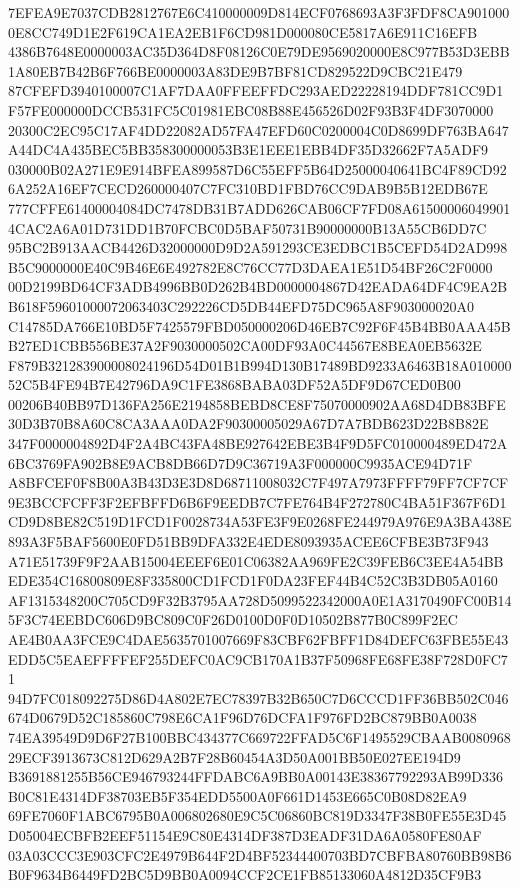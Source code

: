 \documentclass[UTF8,fontset=fandol,zihao=-4,a4paper]{ctexart}
\begin{document}
{{7EFEA9E7037CDB2812767E6C410000009D814ECF0768693A3F3FDF8CA9010000E8CC749D1E2F619CA1EA2EB1F6CD981D000080CE5817A6E911C16EFB
4386B7648E0000003AC35D364D8F08126C0E79DE9569020000E8C977B53D3EBB1A80EB7B42B6F766BE0000003A83DE9B7BF81CD829522D9CBC21E479
87CFEFD3940100007C1AF7DAA0FFEEFFDC293AED22228194DDF781CC9D1F57FE000000DCCB531FC5C01981EBC08B88E456526D02F93B3F4DF3070000
20300C2EC95C17AF4DD22082AD57FA47EFD60C0200004C0D8699DF763BA647A44DC4A435BEC5BB358300000053B3E1EEE1EBB4DF35D32662F7A5ADF9
030000B02A271E9E914BFEA899587D6C55EFF5B64D25000040641BC4F89CD926A252A16EF7CECD260000407C7FC310BD1FBD76CC9DAB9B5B12EDB67E
777CFFE61400004084DC7478DB31B7ADD626CAB06CF7FD08A615000060499014CAC2A6A01D731DD1B70FCBC0D5BAF50731B90000000B13A55CB6DD7C
95BC2B913AACB4426D32000000D9D2A591293CE3EDBC1B5CEFD54D2AD998B5C9000000E40C9B46E6E492782E8C76CC77D3DAEA1E51D54BF26C2F0000
00D2199BD64CF3ADB4996BB0D262B4BD0000004867D42EADA64DF4C9EA2BB618F59601000072063403C292226CD5DB44EFD75DC965A8F903000020A0
C14785DA766E10BD5F7425579FBD050000206D46EB7C92F6F45B4BB0AAA45BB27ED1CBB556BE37A2F9030000502CA00DF93A0C44567E8BEA0EB5632E
F879B321283900008024196D54D01B1B994D130B17489BD9233A6463B18A01000052C5B4FE94B7E42796DA9C1FE3868BABA03DF52A5DF9D67CED0B00
00206B40BB97D136FA256E2194858BEBD8CE8F75070000902AA68D4DB83BFE30D3B70B8A60C8CA3AAA0DA2F90300005029A67D7A7BDB623D22B8B82E
347F0000004892D4F2A4BC43FA48BE927642EBE3B4F9D5FC010000489ED472A6BC3769FA902B8E9ACB8DB66D7D9C36719A3F000000C9935ACE94D71F
A8BFCEF0F8B00A3B43D3E3D8D68711008032C7F497A7973FFFF79FF7CF7CF9E3BCCFCFF3F2EFBFFD6B6F9EEDB7C7FE764B4F272780C4BA51F367F6D1
CD9D8BE82C519D1FCD1F0028734A53FE3F9E0268FE244979A976E9A3BA438E893A3F5BAF5600E0FD51BB9DFA332E4EDE8093935ACEE6CFBE3B73F943
A71E51739F9F2AAB15004EEEF6E01C06382AA969FE2C39FEB6C3EE4A54BBEDE354C16800809E8F335800CD1FCD1F0DA23FEF44B4C52C3B3DB05A0160
AF1315348200C705CD9F32B3795AA728D5099522342000A0E1A3170490FC00B145F3C74EEBDC606D9BC809C0F26D0100D0F0D10502B877B0C899F2EC
AE4B0AA3FCE9C4DAE5635701007669F83CBF62FBFF1D84DEFC63FBE55E43EDD5C5EAEFFFFEF255DEFC0AC9CB170A1B37F50968FE68FE38F728D0FC71
94D7FC018092275D86D4A802E7EC78397B32B650C7D6CCCD1FF36BB502C046674D0679D52C185860C798E6CA1F96D76DCFA1F976FD2BC879BB0A0038
74EA39549D9D6F27B100BBC434377C669722FFAD5C6F1495529CBAAB008096829ECF3913673C812D629A2B7F28B60454A3D50A001BB50E027EE194D9
B3691881255B56CE946793244FFDABC6A9BB0A00143E38367792293AB99D336B0C81E4314DF38703EB5F354EDD5500A0F661D1453E665C0B08D82EA9
69FE7060F1ABC6795B0A006802680E9C5C06860BC819D3347F38B0FE55E3D45D05004ECBFB2EEF51154E9C80E4314DF387D3EADF31DA6A0580FE80AF
03A03CCC3E903CFC2E4979B644F2D4BF52344400703BD7CBFBA80760BB98B6B0F9634B6449FD2BC5D9BB0A0094CCF2CE1FB85133060A4812D35CF9B3
}}
\end{document}
